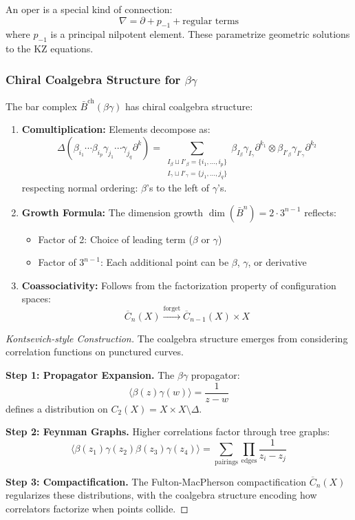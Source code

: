 \begin{remark}
An oper is a special kind of connection:
\[
\nabla = \partial + p_{-1} + \text{regular terms}
\]
where $p_{-1}$ is a principal nilpotent element. These parametrize geometric solutions 
to the KZ equations.
\end{remark}

\subsubsection{Chiral Coalgebra Structure for $\beta\gamma$}

\begin{theorem}\label{thm:bg-bar-coalg}
The bar complex $\bar{B}^{\text{ch}}(\beta\gamma)$ has chiral coalgebra structure:
\begin{enumerate}
\item \textbf{Comultiplication:} Elements decompose as:
\[
\Delta(\beta_{i_1} \cdots \beta_{i_p} \gamma_{j_1} \cdots \gamma_{j_q} \partial^k) = 
\sum_{\substack{I_\beta \sqcup I'_\beta = \{i_1,\ldots,i_p\} \\ I_\gamma \sqcup I'_\gamma = \{j_1,\ldots,j_q\}}} 
\beta_{I_\beta}\gamma_{I_\gamma}\partial^{k_1} \otimes \beta_{I'_\beta}\gamma_{I'_\gamma}\partial^{k_2}
\]
respecting normal ordering: $\beta$'s to the left of $\gamma$'s.

\item \textbf{Growth Formula:} The dimension growth $\dim(\bar{B}^n) = 2 \cdot 3^{n-1}$ reflects:
\begin{itemize}
\item Factor of 2: Choice of leading term ($\beta$ or $\gamma$)
\item Factor of $3^{n-1}$: Each additional point can be $\beta$, $\gamma$, or derivative
\end{itemize}

\item \textbf{Coassociativity:} Follows from the factorization property of configuration spaces:
\[
\overline{C}_{n}(X) \xrightarrow{\text{forget}} \overline{C}_{n-1}(X) \times X
\]
\end{enumerate}
\end{theorem}

\begin{proof}[Kontsevich-style Construction]
The coalgebra structure emerges from considering correlation functions on punctured curves.

\textbf{Step 1: Propagator Expansion.} The $\beta\gamma$ propagator:
\[
\langle \beta(z)\gamma(w) \rangle = \frac{1}{z-w}
\]
defines a distribution on $C_2(X) = X \times X \setminus \Delta$.

\textbf{Step 2: Feynman Graphs.} Higher correlations factor through tree graphs:
\[
\langle \beta(z_1)\gamma(z_2)\beta(z_3)\gamma(z_4) \rangle = 
\sum_{\text{pairings}} \prod_{\text{edges}} \frac{1}{z_i - z_j}
\]

\textbf{Step 3: Compactification.} The Fulton-MacPherson compactification $\overline{C}_n(X)$ 
regularizes these distributions, with the coalgebra structure encoding how correlators 
factorize when points collide.
\end{proof}


